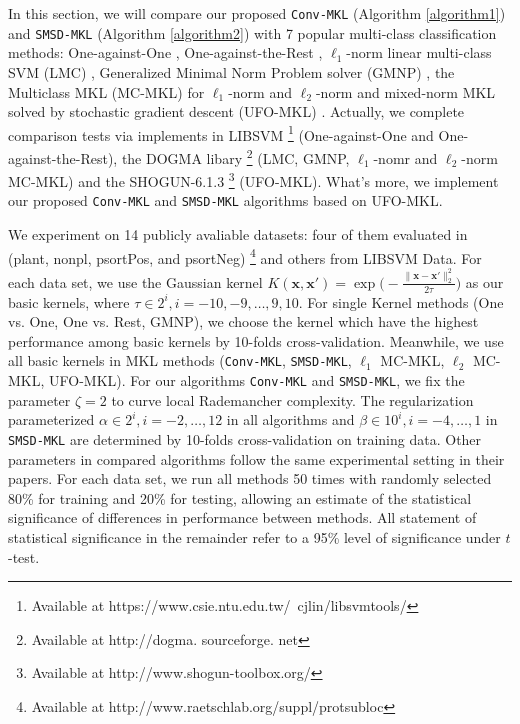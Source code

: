 \documentclass{article}
\begin{document}
In this section, we will  compare our proposed \texttt{Conv-MKL} (Algorithm \ref{algorithm1}) and \texttt{SMSD-MKL} (Algorithm \ref{algorithm2})
with 7 popular multi-class classification methods:
 One-against-One \cite{knerr1990single}, One-against-the-Rest \cite{bottou1994comparison},
$\ell_1$-norm linear multi-class SVM (LMC) \cite{CrammerS02},
Generalized Minimal Norm Problem solver (GMNP) \cite{franc2005optimization},
the Multiclass MKL (MC-MKL) for $\ell_1$-norm and $\ell_2$-norm \cite{ZienO2007}
and mixed-norm MKL solved by stochastic gradient descent (UFO-MKL) \cite{OrabonaL11}.
Actually, we complete comparison tests via implements in LIBSVM \footnote{Available at https://www.csie.ntu.edu.tw/~cjlin/libsvmtools/}
(One-against-One and One-against-the-Rest),
the DOGMA libary \footnote{Available at http://dogma. sourceforge. net} (LMC, GMNP,
$\ell_1$-nomr and $\ell_2$-norm MC-MKL) and the SHOGUN-6.1.3 \footnote{Available at http://www.shogun-toolbox.org/} (UFO-MKL).
What's more, we implement our proposed \texttt{Conv-MKL} and \texttt{SMSD-MKL} algorithms based on UFO-MKL.

We experiment on 14 publicly avaliable datasets:
four of them evaluated in \cite{ZienO2007} (plant, nonpl, psortPos, and psortNeg)
\footnote{Available at http://www.raetschlab.org/suppl/protsubloc}
and others from LIBSVM Data. %
For each data set, we use the Gaussian kernel
$K(\mathbf{x}, \mathbf{x}')=\exp\Big(-\frac{\|\mathbf{x}-\mathbf{x}'\|_2^2}{2\tau}\Big)$ as our basic kernels,
where $\tau \in {2^i, i=-10,-9,\ldots,9,10}$. For single Kernel methods (One vs. One, One vs. Rest, GMNP),
we choose the kernel which have the highest performance among basic kernels by 10-folds cross-validation.
Meanwhile, we use all basic kernels in MKL methods (\texttt{Conv-MKL}, \texttt{SMSD-MKL}, $\ell_1$ MC-MKL, $\ell_2$ MC-MKL, UFO-MKL).
For our algorithms \texttt{Conv-MKL} and \texttt{SMSD-MKL}, we fix the parameter $\zeta=2$ to curve local Rademancher complexity.
The regularization parameterized $\alpha \in {2^i, i=-2, \ldots, 12}$ in all algorithms and
$\beta \in {10^i, i=-4, \ldots, 1}$ in \texttt{SMSD-MKL} are determined by 10-folds cross-validation on training data.
Other parameters in compared algorithms follow the same experimental setting in their papers.
For each data set, we run all methods 50 times with randomly selected 80\% for training and 20\% for testing,
allowing an estimate of the statistical significance of differences
in performance between methods.
All statement of statistical significance in the remainder refer to a 95\% level of significance under $t$-test.
\end{document}

